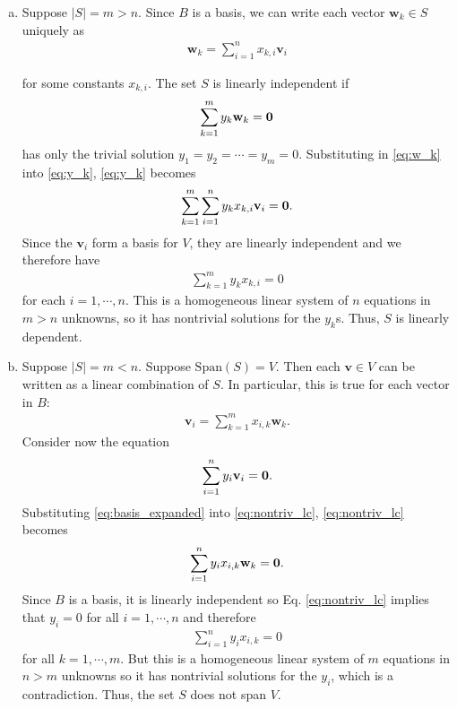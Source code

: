 \documentclass[12pt,letterpaper,reqno]{article}
\numberwithin{equation}{section}
\newcommand{\bv}{\mathbf{v}}
\newcommand{\bw}{\mathbf{w}}
\begin{document}
\begin{pf}
	\begin{enumerate}[(a)]
		\item Suppose $|S|=m>n$. Since $B$ is a basis, we can write each vector $\bw_k \in S$ uniquely as 
\begin{align}\label{eq:w_k}
	\bw_k=\sum_{i=1}^nx_{k,i}\bv_i
\end{align}
		
		 for some constants $x_{k,i}$. The set $S$ is linearly independent if  
		\begin{align}\label{eq:y_k}
			\sum_{k=1}^my_k\bw_k={\bf 0}
		\end{align}
		 has only the trivial solution $y_1=y_2=\cdots=y_m=0$. Substituting in \eqref{eq:w_k} into \eqref{eq:y_k}, \eqref{eq:y_k} becomes
		 \begin{align*}
		 	\sum_{k=1}^m\sum_{i=1}^ny_kx_{k,i}\bv_i={\bf 0}.
		 \end{align*}
		Since the $\bv_i$ form a basis for $V$, they are linearly independent and we therefore have
		\begin{align}
			\sum_{k=1}^my_kx_{k,i}=0
		\end{align} 
		for each $i=1,\cdots,n$. This is a homogeneous linear system of $n$ equations in $m>n$ unknowns, so it has nontrivial solutions for the $y_k$s. Thus, $S$ is linearly dependent.
		\item Suppose $|S|=m<n$. Suppose $\text{Span}(S)=V$. Then each $\bv \in V$ can be written as a linear combination of $S$. In particular, this is true for each vector in $B$:
		\begin{align}\label{eq:basis_expanded}
			\bv_i=\sum_{k=1}^m x_{i,k}\bw_k.
		\end{align}
		Consider now the equation 
		\begin{align}\label{eq:nontriv_lc}
			\sum_{i=1}^ny_i\bv_i={\bf 0}.
		\end{align}
		Substituting \eqref{eq:basis_expanded} into \eqref{eq:nontriv_lc}, \eqref{eq:nontriv_lc} becomes
		\begin{align}
			\sum_{i=1}^ny_ix_{i,k}\bw_k={\bf 0}.
		\end{align}
	Since $B$ is a basis, it is linearly independent so Eq. \eqref{eq:nontriv_lc} implies that $y_i=0$ for all $i=1,\cdots, n$ and therefore 
	\begin{align}
		\sum_{i=1}^ny_ix_{i,k}=0
	\end{align}
	for all $k=1,\cdots,m$. But this is a homogeneous linear system of $m$ equations in $n>m$ unknowns so it has nontrivial solutions for the $y_i$, which is a contradiction. Thus, the set $S$ does not span $V$.
	\end{enumerate}
\end{pf}
\end{document}
